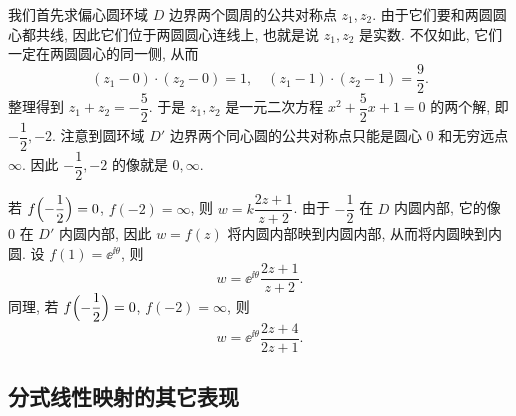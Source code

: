 \begin{solution}
  我们首先求偏心圆环域 $D$ 边界两个圆周的公共对称点 $z_1,z_2$.
  由于它们要和两圆圆心都共线, 因此它们位于两圆圆心连线上, 也就是说 $z_1,z_2$ 是实数.
  不仅如此, 它们一定在两圆圆心的同一侧, 从而
  \[
    (z_1-0)\cdot (z_2-0)=1,\quad
    (z_1-1)\cdot(z_2-1)=\frac92.
  \]
  整理得到 $z_1+z_2=-\dfrac{5}2$.
  于是 $z_1,z_2$ 是一元二次方程 $x^2+\dfrac52x+1=0$ 的两个解, 即 $-\dfrac12,-2$.
  注意到圆环域 $D'$ 边界两个同心圆的公共对称点只能是圆心 $0$ 和无穷远点 $\infty$.
  因此 $-\dfrac12,-2$ 的像就是 $0,\infty$.

  若 $f\Bigl(-\dfrac12\Bigr)=0$, $f(-2)=\infty$, 则 $w=k\dfrac{2z+1}{z+2}$.
  由于 $-\dfrac12$ 在 $D$ 内圆内部, 它的像 $0$ 在 $D'$ 内圆内部, 因此 $w=f(z)$ 将内圆内部映到内圆内部, 从而将内圆映到内圆.
  设 $f(1)=\ee^{\ii\theta}$, 则
  \[
    w=\ee^{\ii\theta}\dfrac{2z+1}{z+2}.
  \]
  同理, 若 $f\Bigl(-\dfrac12\Bigr)=0$, $f(-2)=\infty$, 则 
  \[
    w=\ee^{\ii\theta}\dfrac{2z+4}{2z+1}.
  \]
\end{solution}


\subsection{分式线性映射的其它表现\optional}

